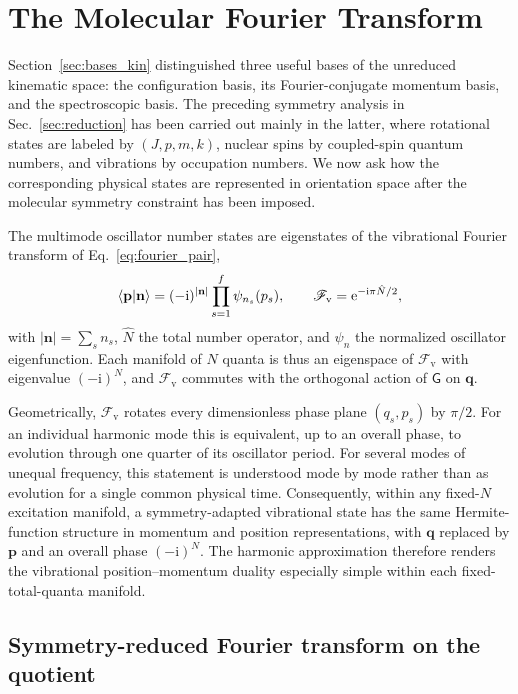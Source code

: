 \documentclass[
  reprint,
  aps,
  prx,
  superscriptaddress,
  amsmath,
  amssymb,
  longbibliography
]{revtex4-2}
\newcommand{\grp}[1]{\mathsf{#1}}
\newcommand{\iunit}{\mathrm{i}}
\newcommand{\expe}{\mathrm{e}}
\newcommand{\parity}{p}               %
\begin{document}
\section{The Molecular Fourier Transform}
\label{sec:fourier}


Section~\ref{sec:bases_kin} distinguished three useful bases of the unreduced kinematic space: the configuration basis, its Fourier-conjugate momentum basis, and the spectroscopic basis. The preceding symmetry analysis in Sec.~\ref{sec:reduction} has been carried out mainly in the latter, where rotational states are labeled by \((J,\parity,m,k)\), nuclear spins by coupled-spin quantum numbers, and vibrations by occupation numbers. We now ask how the corresponding physical states are represented in orientation space after the molecular symmetry constraint has been imposed.

The multimode oscillator number states are eigenstates of the vibrational Fourier transform of Eq.~\eqref{eq:fourier_pair},
\begin{equation}
\braket{\mathbf p|\mathbf n}=(-\iunit)^{|\mathbf n|}\prod_{s=1}^{f}\psi_{n_s}(p_s),\qquad
\mathscr F_{\mathrm v}=\expe^{-\iunit\pi\hat N/2},
\label{eq:vib_fourier}
\end{equation}
with $|\mathbf n|=\sum_s n_s$, $\hat N$ the total number operator, and $\psi_{n}$ the normalized oscillator eigenfunction. Each manifold of $N$ quanta is thus an eigenspace of $\mathscr F_{\mathrm v}$ with eigenvalue $(-\iunit)^N$, and $\mathscr F_{\mathrm v}$ commutes with the orthogonal action of $\grp{G}$ on $\mathbf q$.

Geometrically, \(\mathscr F_{\mathrm v}\) rotates every dimensionless phase plane \((q_s,p_s)\) by \(\pi/2\). For an individual harmonic mode this is equivalent, up to an overall phase, to evolution through one quarter of its oscillator period. For several modes of unequal frequency, this statement is understood mode by mode rather than as evolution for a single common physical time. Consequently, within any fixed-\(N\) excitation manifold, a symmetry-adapted vibrational state has the same Hermite-function structure in momentum and position representations, with \(\mathbf q\) replaced by \(\mathbf p\) and an overall phase \((-\iunit)^N\). The harmonic approximation therefore renders the vibrational position--momentum duality especially simple within each fixed-total-quanta manifold.





\subsection{Symmetry-reduced Fourier transform on the quotient}
\label{sec:fourier_motivation}
\end{document}
